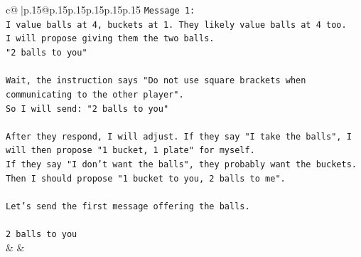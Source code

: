 \documentclass{article}
\begin{document}
{\begin{supertabular}{c@{$\;$}|p{.15\linewidth}@{}p{.15\linewidth}p{.15\linewidth}p{.15\linewidth}p{.15\linewidth}p{.15\linewidth}}
{{{\texttt{Message 1:} \\
\texttt{I value balls at 4, buckets at 1. They likely value balls at 4 too.} \\
\texttt{I will propose giving them the two balls.} \\
\texttt{"2 balls to you"} \\
\\ 
\texttt{Wait, the instruction says "Do not use square brackets when communicating to the other player".} \\
\texttt{So I will send: "2 balls to you"} \\
\\ 
\texttt{After they respond, I will adjust. If they say "I take the balls", I will then propose "1 bucket, 1 plate" for myself.} \\
\texttt{If they say "I don't want the balls", they probably want the buckets. Then I should propose "1 bucket to you, 2 balls to me".} \\
\\ 
\texttt{Let's send the first message offering the balls.} \\
\\ 
\texttt{2 balls to you} \\
            }
        }
    }
    & & \\ \\


\end{supertabular}}
\end{document}
